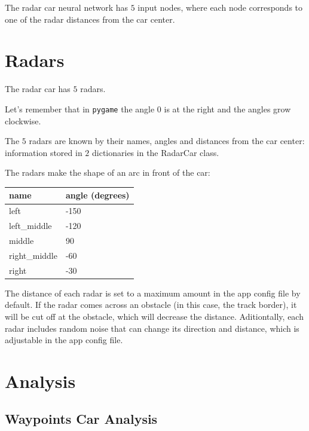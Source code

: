 \documentclass[a4paper]{article}
\begin{document}
The radar car neural network has $5$ input nodes, where each node corresponds to one of the radar distances from the car center.

\section{Radars}
\label{sec:radars}

The radar car has $5$ radars.

Let's remember that in \texttt{pygame} the angle $0$ is at the right and the angles grow clockwise.

The $5$ radars are known by their names, angles and distances from the car center: information stored in $2$ dictionaries in the RadarCar class.

The radars make the shape of an arc in front of the car:

\begin{table}[]
\begin{tabular}{|l|l|}
\hline
\textbf{name} & \textbf{angle (degrees)} \\
\hline
left          & -150 \\
left\_middle  & -120 \\
middle        & 90   \\
right\_middle & -60  \\
right         & -30  \\
\hline
\end{tabular}
\end{table}

The distance of each radar is set to a maximum amount in the app config file by default. If the radar comes across an obstacle (in this case, the track border), it will be cut off at the obstacle, which will decrease the distance. Aditiontally, each radar includes random noise that can change its direction and distance, which is adjustable in the app config file.

\section{Analysis}
\label{sec:analysis}


\subsection{Waypoints Car Analysis}
\label{subsec:waypoints-car-analysis}
\end{document}
